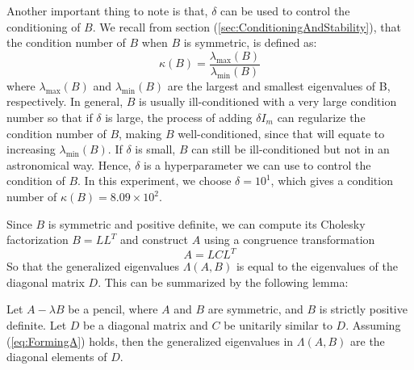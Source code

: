 Another important thing to note is that, $\delta$ can be used to control the conditioning of $B$. We recall from section (\ref{sec:ConditioningAndStability}), that the condition number of $B$ when $B$ is symmetric, is defined as:
\begin{equation}
	\kappa(B) = \frac{\lambda_{\max}(B)}{\lambda_{\min}(B)}
\end{equation}
where $\lambda_{\max}(B)$ and $\lambda_{\min}(B)$ are the largest and smallest eigenvalues of B, respectively.
In general, $B$ is usually ill-conditioned with a very large condition number so that if $\delta$ is large, the process of adding $\delta I_m$ can regularize the condition number of $B$, making $B$ well-conditioned, since that will equate to increasing $\lambda_{\min}(B)$. If $\delta$ is small, $B$ can still be ill-conditioned but not in an astronomical way. Hence, $\delta$ is a hyperparameter we can use to control the condition of $B$. In this experiment, we choose $\delta = 10^{1}$, which gives a condition number of $\kappa(B) = 8.09 \times 10^2$.

Since $B$ is symmetric and positive definite, we can compute its Cholesky factorization $B = LL^T$ and construct $A$ using a congruence transformation
\begin{equation}\label{eq:FormingA}
	A = LCL^T
\end{equation}
So that the generalized eigenvalues $\Lambda(A, B)$ is equal to the eigenvalues of the diagonal matrix $D$. This can be summarized by the following lemma:
\begin{lemma}
  Let $A-\lambda B$ be a pencil, where $A$ and $B$ are symmetric, and $B$ is strictly positive definite. Let $D$ be a diagonal matrix and $C$ be unitarily similar to $D$. Assuming (\ref{eq:FormingA}) holds, then the  generalized eigenvalues in $\Lambda(A, B)$ are the diagonal elements of $D$.
\end{lemma}

